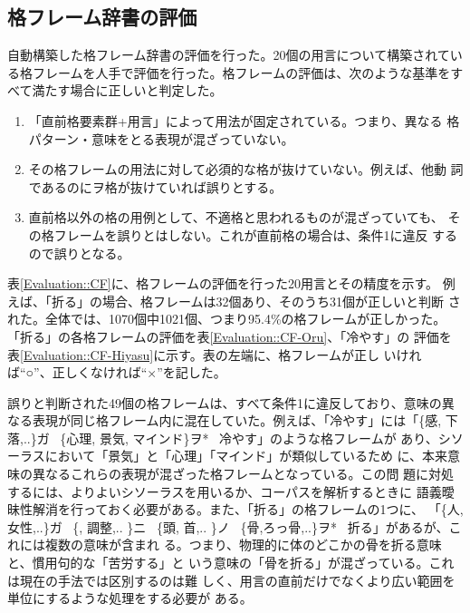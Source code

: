 \documentclass[fleqn]{nlp}
\newcommand{\sm}[1]{}
\begin{document}
\subsection{格フレーム辞書の評価}

自動構築した格フレーム辞書の評価を行った。20個の用言について構築されてい
る格フレームを人手で評価を行った。格フレームの評価は、次のような基準をす
べて満たす場合に正しいと判定した。

\begin{enumerate}
 \item 「直前格要素群+用言」によって用法が固定されている。つまり、異なる
       格パターン・意味をとる表現が混ざっていない。
 \item その格フレームの用法に対して必須的な格が抜けていない。例えば、他動
       詞であるのにヲ格が抜けていれば誤りとする。
 \item 直前格以外の格の用例として、不適格と思われるものが混ざっていても、
       その格フレームを誤りとはしない。これが直前格の場合は、条件1に違反
       するので誤りとなる。
\end{enumerate}

\vspace*{2ex}

表\ref{Evaluation::CF}に、格フレームの評価を行った20用言とその精度を示す。
例えば、「折る」の場合、格フレームは32個あり、そのうち31個が正しいと判断
された。全体では、1070個中1021個、つまり95.4\%の格フレームが正しかった。
「折る」の各格フレームの評価を表\ref{Evaluation::CF-Oru}、「冷やす」の
評価を表\ref{Evaluation::CF-Hiyasu}に示す。表の左端に、格フレームが正し
いければ``○''、正しくなければ``×''を記した。

誤りと判断された49個の格フレームは、すべて条件1に違反しており、意味の異
なる表現が同じ格フレーム内に混在していた。例えば、「冷やす」には「\{感, 
下落,..\}ガ \ \{心理, 景気, マインド\}ヲ* \ 冷やす」のような格フレームが
あり、シソーラスにおいて「景気」と「心理」「マインド」が類似しているため
に、本来意味の異なるこれらの表現が混ざった格フレームとなっている。この問
題に対処するには、よりよいシソーラスを用いるか、コーパスを解析するときに
語義曖昧性解消を行っておく必要がある。また、「折る」の格フレームの1つに、
「\{\sm{数量}人,女性,..\}ガ \ \{\sm{補文}, 調整,..  \}ニ \ \{頭, 首,..
\}ノ \ \{骨,ろっ骨,..\}ヲ* \ 折る」があるが、これには複数の意味が含まれ
る。つまり、物理的に体のどこかの骨を折る意味と、慣用句的な「苦労する」と
いう意味の「骨を折る」が混ざっている。これは現在の手法では区別するのは難
しく、用言の直前だけでなくより広い範囲を単位にするような処理をする必要が
ある。
\end{document}
